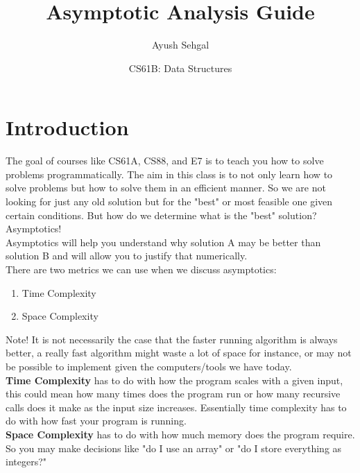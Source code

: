 \documentclass{article}
\title{Asymptotic Analysis Guide}
\author{Ayush Sehgal}
\date{CS61B: Data Structures}
\begin{document}
\maketitle

\section{Introduction}
The goal of courses like CS61A, CS88, and E7 is to teach you how to solve problems programmatically. The aim in this class is to not only learn how to solve problems but how to solve them in an efficient manner. So we are not looking for just any old solution but for the "best" or most feasible one given certain conditions. But how do we determine what is the "best" solution? Asymptotics! \\
Asymptotics will help you understand why solution A may be better than solution B and will allow you to justify that numerically. \\
There are two metrics we can use when we discuss asymptotics: 
\begin{enumerate}
    \item Time Complexity
    \item Space Complexity
\end{enumerate}
Note! It is not necessarily the case that the faster running algorithm is always better, a really fast algorithm might waste a lot of space for instance, or may not be possible to implement given the computers/tools we have today. \\
\newline
\textbf{Time Complexity} has to do with how the program scales with a given input, this could mean how many times does the program run or how many recursive calls does it make as the input size increases. Essentially time complexity has to do with how fast your program is running. \\
\textbf{Space Complexity} has to do with how much memory does the program require. So you may make decisions like "do I use an array" or "do I store everything as integers?"\\
\newpage
\end{document}

